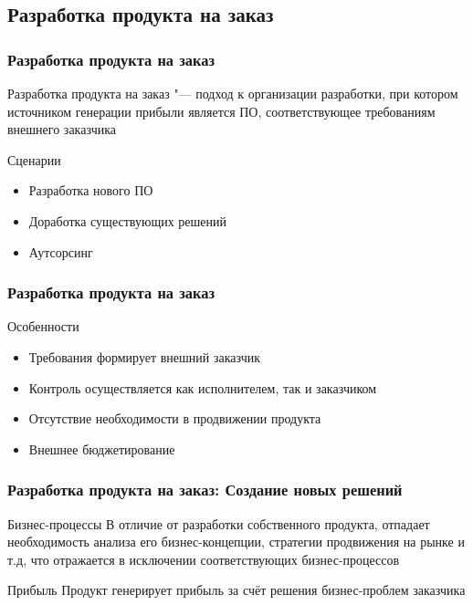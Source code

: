 \documentclass{../industrial-development}
\begin{document}
\subsection{Разработка продукта на заказ}


\begin{frame} \frametitle{Разработка продукта на заказ}
	\begin{block}{}
		\alert{Разработка продукта на заказ} "--- подход к организации разработки, при котором источником генерации прибыли является ПО, соответствующее требованиям внешнего заказчика
	\end{block}
	\begin{block}{Сценарии}
		\begin{itemize}
			\item Разработка нового ПО
			\item Доработка существующих решений
			\item Аутсорсинг
		\end{itemize}
	\end{block}
\end{frame}
\lecturenotes


\begin{frame} \frametitle{Разработка продукта на заказ}
	\begin{block}{Особенности}
		\begin{itemize}
			\item Требования формирует внешний заказчик
			\item Контроль осуществляется как исполнителем, так и заказчиком
			\item Отсутствие необходимости в продвижении продукта
			\item Внешнее бюджетирование
		\end{itemize}
	\end{block}
\end{frame}
\lecturenotes
	

\begin{frame} \frametitle{Разработка продукта на заказ: Создание новых решений}
	\begin{block}{Бизнес-процессы}
		В отличие от разработки собственного продукта, отпадает необходимость анализа его бизнес-концепции, стратегии продвижения на рынке и т.д, что отражается в исключении соответствующих бизнес-процессов
	\end{block}
	\begin{block}{Прибыль}
		Продукт генерирует прибыль за счёт решения бизнес-проблем заказчика
	\end{block}
\end{frame}
\lecturenotes
\end{document}
